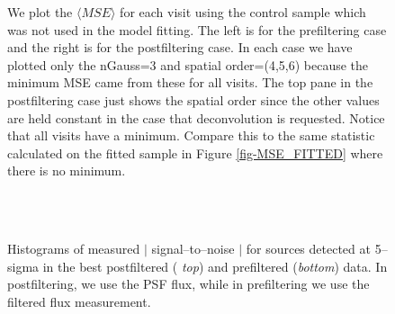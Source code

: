 \documentclass[prd, nofootinbib, floatfix, 11pt,tightenlines,times]{article}
\begin{document}
{\begin{figure}%
\centering
{}
\caption{We plot the $\langle MSE \rangle$ for each visit using the control sample which was not used in the
model fitting.  The left is for the prefiltering case and the right is for the 
postfiltering case.  In each case we have plotted only the nGauss=3 and spatial order=(4,5,6) because the minimum MSE came
from these for all visits.  The top pane in the postfiltering case just shows the spatial order since the other 
values are held constant in the case that deconvolution is requested.  Notice that all visits have a minimum.
Compare this to the same statistic calculated on the fitted sample in Figure \ref{fig-MSE_FITTED} where there is no minimum.}
\label{fig-MSE_CONTROL}
\end{figure}


\begin{figure}
\begin{center}
 \\
 \\
\end{center}
\caption{Histograms of measured $|$ signal--to--noise $|$
  for sources detected at 5--sigma in the best postfiltered ({\it
    top}) and prefiltered ({\it bottom}) data.  In postfiltering, we
  use the PSF flux, while in prefiltering we use the filtered flux
  measurement.  }
\label{fluxerr}
\end{figure}

}
\end{document}
